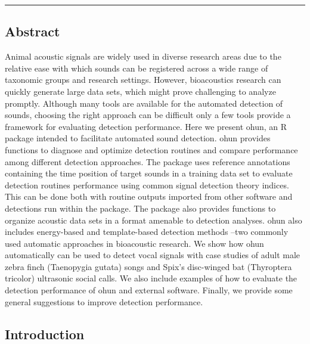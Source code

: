 \documentclass[
]{article}
\begin{document}
\begin{center}\rule{0.5\linewidth}{0.5pt}\end{center}

\hypertarget{abstract}{%
\subsection{Abstract}\label{abstract}}

Animal acoustic signals are widely used in diverse research areas due to
the relative ease with which sounds can be registered across a wide
range of taxonomic groups and research settings. However, bioacoustics
research can quickly generate large data sets, which might prove
challenging to analyze promptly. Although many tools are available for
the automated detection of sounds, choosing the right approach can be
difficult only a few tools provide a framework for evaluating detection
performance. Here we present ohun, an R package intended to facilitate
automated sound detection. ohun provides functions to diagnose and
optimize detection routines and compare performance among different
detection approaches. The package uses reference annotations containing
the time position of target sounds in a training data set to evaluate
detection routines performance using common signal detection theory
indices. This can be done both with routine outputs imported from other
software and detections run within the package. The package also
provides functions to organize acoustic data sets in a format amenable
to detection analyses. ohun also includes energy-based and
template-based detection methods --two commonly used automatic
approaches in bioacoustic research. We show how ohun automatically can
be used to detect vocal signals with case studies of adult male zebra
finch (Taenopygia gutata) songs and Spix's disc-winged bat (Thyroptera
tricolor) ultrasonic social calls. We also include examples of how to
evaluate the detection performance of ohun and external software.
Finally, we provide some general suggestions to improve detection
performance.

\hypertarget{introduction}{%
\subsection{Introduction}\label{introduction}}
\end{document}
